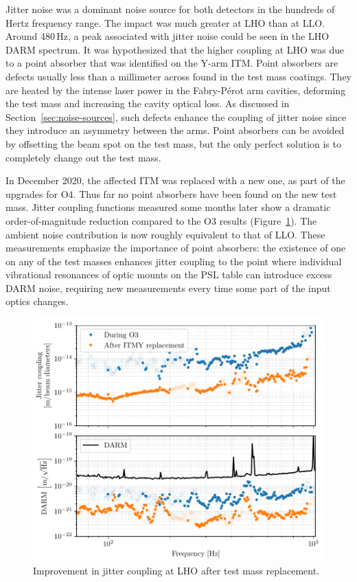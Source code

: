 Jitter noise was a dominant noise source for both detectors in the hundreds of Hertz frequency range.
The impact was much greater at LHO than at LLO.
Around 480\,Hz, a peak associated with jitter noise could be seen in the LHO DARM spectrum.
It was hypothesized that the higher coupling at LHO was due to a point absorber that was identified on the Y-arm \ac{ITM}.
Point absorbers are defects usually less than a millimeter across found in the test mass coatings.
They are heated by the intense laser power in the Fabry-P\'erot arm cavities, deforming the test mass and increasing the cavity optical loss.
As discussed in Section~\ref{sec:noise-sources}, such defects enhance the coupling of jitter noise since they introduce an asymmetry between the arms.
Point absorbers can be avoided by offsetting the beam spot on the test mass, but the only perfect solution is to completely change out the test mass.

In December 2020, the affected ITM was replaced with a new one, as part of the upgrades for \ac{O4}.
Thus far no point absorbers have been found on the new test mass.
Jitter coupling functions measured some months later show a dramatic order-of-magnitude reduction compared to the O3 results (Figure~\ref{fig:vib-jitter}).
The ambient noise contribution is now roughly equivalent to that of LLO.
These measurements emphasize the importance of point absorbers: the existence of one on any of the test masses enhances jitter coupling to the point where individual vibrational resonances of optic mounts on the PSL table can introduce excess DARM noise, requiring new measurements every time some part of the input optics changes.


\begin{figure}
	\centering
	\includegraphics{figures/noise-studies/noise-jitter.pdf}
	\caption{Improvement in jitter coupling at LHO after test mass replacement.}
	\label{fig:vib-jitter}
\end{figure}

